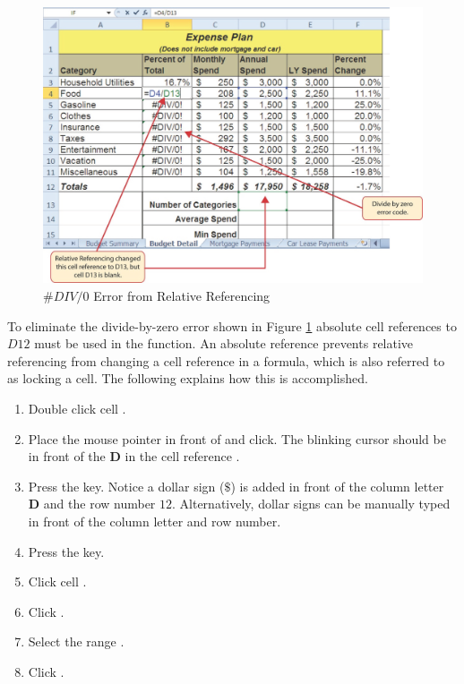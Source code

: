 \begin{figure}[H]
	\centering
	\includegraphics[width=\maxwidth{.95\linewidth}]{gfx/ch02_fig15}
	\caption{$ \#DIV/0 $ Error from Relative Referencing}
	\label{02:fig15}
\end{figure}

To eliminate the divide-by-zero error shown in Figure \ref{02:fig15} absolute cell references to $ D12 $ must be used in the function. An absolute reference prevents relative referencing from changing a cell reference in a formula, which is also referred to as locking a cell. The following explains how this is accomplished.

\begin{enumerate}
	\item Double click cell .
	\item Place the mouse pointer in front of  and click. The blinking cursor should be in front of the \textbf{D} in the cell reference .
	\item Press the  key. Notice a dollar sign ($ \$ $) is added in front of the column letter \textbf{D} and the row number \textbf{$ 12 $}. Alternatively, dollar signs can be manually typed in front of the column letter and row number.
	\item Press the  key.
	\item Click cell .
	\item Click .
	\item Select the range .
	\item Click .
\end{enumerate}

